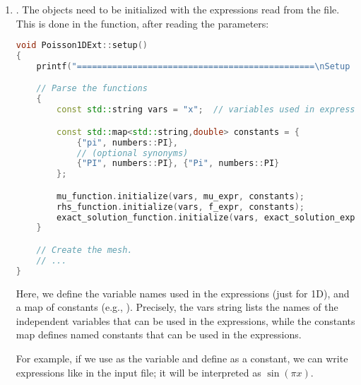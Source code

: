 \begin{enumerate}
\begin{lstlisting}[language=C++,mathescape=true]
ParameterHandler prm;

// Parsed expressions; initialized in setup()
std::string mu_expr, f_expr, exact_solution_expr;

// $\textcolor{codegreen}{\mu}$(x) - diffusion coefficient
FunctionParser<dim> mu_function;
// f(x) - forcing term
FunctionParser<dim> rhs_function;
// u(x) - exact solution (for error computation)
FunctionParser<dim> exact_solution_function;\end{lstlisting}
    Note the  object to manage parameters, the\break strings to hold the parsed expressions (what we read from the file), and the  objects to evaluate them. These  objects are the same concept as  objects, but they can be initialized at runtime with a string expression. So they correspond exactly to:  and .


    \item {}. The  objects need to be initialized with the expressions read from the file. This is done in the  function, after reading the parameters:
    \begin{lstlisting}[language=C++]
void Poisson1DExt::setup()
{
    printf("===============================================\nSetup started\n");

    // Parse the functions
    {
        const std::string vars = "x";  // variables used in expressions

        const std::map<std::string,double> constants = {
            {"pi", numbers::PI},
            // (optional synonyms)
            {"PI", numbers::PI}, {"Pi", numbers::PI}
        };

        mu_function.initialize(vars, mu_expr, constants);
        rhs_function.initialize(vars, f_expr, constants);
        exact_solution_function.initialize(vars, exact_solution_expr, constants);
    }

    // Create the mesh.
    // ...
}\end{lstlisting}
    Here, we define the variable names used in the expressions (just  for 1D), and a map of constants (e.g., ). Precisely, the vars string lists the names of the independent variables that can be used in the expressions, while the constants map defines named constants that can be used in the expressions.
    
    For example, if we use  as the variable and define  as a constant, we can write expressions like  in the input file; it will be interpreted as $\sin(\pi x)$.
    

\end{enumerate}
